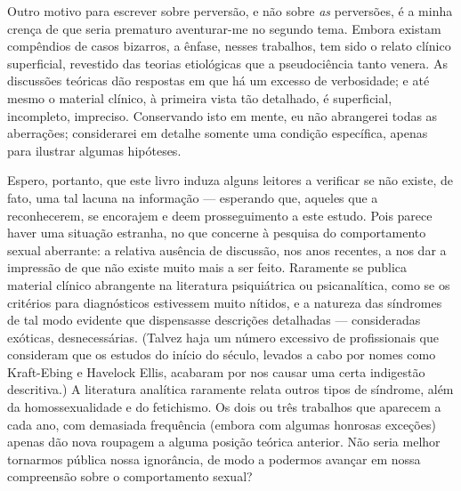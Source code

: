 Outro motivo para escrever sobre perversão, e não sobre \textit{as}
perversões, é a minha crença de que seria prematuro aventurar-me no
segundo tema. Embora existam compêndios de casos bizarros, a ênfase,
nesses trabalhos, tem sido o relato clínico superficial, revestido das
teorias etiológicas que a pseudociência tanto venera. As discussões
teóricas dão respostas em que há um excesso de verbosidade; e até mesmo
o material clínico, à primeira vista tão detalhado, é superficial,
incompleto, impreciso. Conservando isto em mente, eu não abrangerei
todas as aberrações; considerarei em detalhe somente uma condição
específica, apenas para ilustrar algumas hipóteses.

Espero, portanto, que este livro induza alguns leitores a verificar
se não existe, de fato, uma tal lacuna na informação --- esperando que,
aqueles que a reconhecerem, se encorajem e deem prosseguimento a este
estudo. Pois parece haver uma situação estranha, no que concerne à
pesquisa\idxaberrpesq{} do comportamento sexual aberrante: a relativa ausência de
discussão, nos anos recentes, a nos dar a impressão de que não existe
muito mais a ser feito. Raramente se publica material clínico
abrangente na literatura psiquiátrica ou psicanalítica, como se os
critérios para diagnósticos estivessem muito nítidos, e a natureza das
síndromes de tal modo evidente que dispensasse descrições detalhadas ---
consideradas exóticas, desnecessárias. (Talvez haja um número excessivo
de profissionais que consideram que os estudos do início do século,
levados a cabo por nomes como Kraft-Ebing\idxkraft{} e Havelock Ellis,\idxellis{} acabaram
por nos causar uma certa indigestão descritiva.) A literatura analítica
raramente relata outros tipos de síndrome, além da homossexualidade\idxhomos{} e
do fetichismo.\idxfetic{} Os dois ou três trabalhos que aparecem a cada ano, com
demasiada frequência (embora com algumas honrosas exceções) apenas dão
nova roupagem a alguma posição teórica anterior. Não seria melhor
tornarmos pública nossa ignorância, de modo a podermos avançar em nossa
compreensão sobre o comportamento sexual?\idxsexop[|)]

